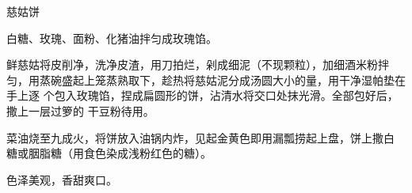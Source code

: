%
%
%
%
%
%
%
\begin{recipe}{慈姑饼}

\ingredients


\preparation

\step 白糖、玫瑰、面粉、化猪油拌匀成玫瑰馅。

\step 鲜慈姑将皮削净，洗净皮渣，用刀拍烂，剁成细泥（不现颗粒），加细酒米粉拌
匀，用蒸碗盛起上笼蒸熟取下，趁热将慈姑泥分成汤圆大小的量，用干净湿帕垫在手上逐
个包入玫瑰馅，捏成扁圆形的饼，沾清水将交口处抹光滑。全部包好后，撒上一层过箩的
干豆粉待用。

\step 菜油烧至九成火，将饼放入油锅内炸，见起金黄色即用漏瓢捞起上盘，饼上撒白
糖或胭脂糖（用食色染成浅粉红色的糖）。

\features

色泽美观，香甜爽口。

\end{recipe}

